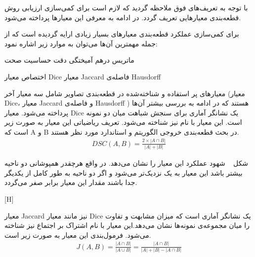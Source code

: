 
با توجه به تعریف‌های فوق ملاحظه گردید که لازم است برای کمی‌سازی ارزیابی روش قطعه‌بندی  معیارهایی تعریف گردد. در ادامه به معرفی این معیارها پرداخته می‌شود.

برای کمی‌سازی عملکرد قطعه‌بندی معیارهای بسیار زیادی ارایه گردیده است که از جمله مهمترین آن‌ها می‌توان به موارد زیر اشاره نمود:

\begin{multicols}{2}
	 ماتریس درهم آمیختگی
	 دقت
	 حساسیت
	 صحت
	
	  اختصاص
	 معیار Dice
	 معیار Jaccard
	 فاصله‌ی Hausdorff
	
\end{multicols}

معیارهای پر استفاده و شناخته‌شده در قطعه‌بندی تصاویر شامل سه معیار آخر (معیار Dice، معیار Jaccard و فاصله‌ی Hausdorff ) هستند که در ادامه به بررسی بیشتر آن‌ها پرداخته می‌شود.
معیار Dice یک نشانگر آماری برای سنجش شباهت میان دو نمونه است. این معیار با نام  نیز شناخته می‌شود. تعریف ریاضیاتی این معیار به صورت زیر است که A و B در بحث قطعه‌بندی خروجی الگوریتم و استاندارد مورد نظر هستند.
\begin{alignat}{5}
	DSC(A, B) = \frac{2 \times |A \cap B|}{|A|+|B|}    \label{dsc_def}
\end{alignat}

شکل ~ شهود عملکرد این معیار را نشان می‌دهد. در واقع هرچقدر همپوشانی دو ناحیه بیشتر باشد این معیار به یک نزدیک‌تر می‌شود و اگر دو ناحیه به طور کامل از یکدیگر جدا باشند مقدار این معیار برابر صفر می‌گردد.

[H]

معیار Jaccard نیز مانند معیار Dice یک نشانگر آماری است که میزان مشابهت و تفاوت را میان مجموعه‌ی نمونه‌ها نشان می‌دهد.این معیار با نام اشتراک بر اجتماع نیز شناخته می‌شود. فرمول‌بندی این معیار به صورت زیر است.
\begin{alignat}{5}
	J(A, B) = \frac{|A \cap B|}{|A \cup B|} = \frac{|A \cap B|}{|A| + |B| - |A \cap B|}   \label{jacc_def}
\end{alignat}

